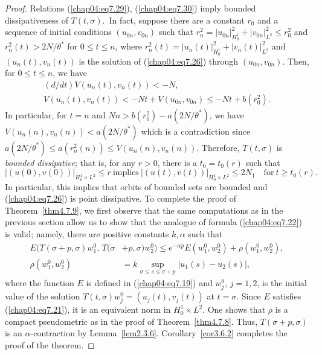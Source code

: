 \documentclass{surv-l}
\theoremstyle{plain}
\theoremstyle{definition}
\numberwithin{equation}{section}
\numberwithin{figure}{chapter}
\begin{document}
\begin{proof}
Relations (\ref{chap04:eq7.29}), (\ref{chap04:eq7.30}) imply bounded dissipativeness of $T(t, \sigma)$.\, In fact, suppose there are a constant $r_{0}$ and a sequence of initial conditions $(u_{0n}, v_{0n})$ such that $r_{n}^{2}=|u_{0n}|_{H_{0}^{1}}^{2}+|v_{0n}|_{L^{2}}^{2}\leq r_{0}^{2}$ and $r_{n}^{2}(t)>2N/\theta^{\ast}$ for $0\leq t\leq n$, where $r_{n}^{2}(t)=|u_{n}(t)|_{H_{0}^{1}}^{2}+|v_{n}(t)|_{L^{2}}^{2}$ and $(u_{n}(t), v_{n}(t))$ is the solution of (\ref{chap04:eq7.26}) through $(u_{0n}, v_{0n})$. Then, for $0\leq t\leq n$, we have
\begin{gather*}
(d/dt)V(u_{n}(t), v_{n}(t))<-N,\\
V(u_{n}(t), v_{n}(t))<-Nt+V(u_{0n}, v_{0n})\leq-Nt+b(r_{0}^{2}).
\end{gather*}
In particular, for $t=n$ and $Nn>b(r_{0}^{2})-a(2N/\theta^{\ast})$, we have $V(u_{n}(n), v_{n}(n))< a(2N/\theta^{\ast})$ which is a contradiction since $a(2N/\theta^{\ast})\leq a(r_{n}^{2}(n))\leq V(u_{n}(n), v_{n}(n))$.
Therefore, $T(t, \sigma)$ is \emph{bounded dissipative}; that is, for any $r>0$, there is a $t_{0}= t_{0}(r)$ such that
\begin{equation*}
|(u(0), v(0))|_{H_{0}^{1}\times L^{2}}\leq r\ \mathrm{implies}\ |(u(t), v(t))|_{H_{0}^{1}\times L^{2}}\leq 2N_{1}\quad \mathrm{for}\ t\geq t_{0}(r).
\end{equation*}
In particular, this implies that orbits of bounded sets are bounded and (\ref{chap04:eq7.26}) is point dissipative. To complete the proof of Theorem~\ref{thm4.7.9}, we first observe that the same computations as in the previous section allow us to show that the analogue of formula (\ref{chap04:eq7.22}) is valid; namely, there are positive constants $k, \alpha$ such that
\begin{align*}
E(T(\sigma+p, \sigma)w_{1}^{0},\, T(\sigma&+p, \sigma)w_{2}^{0})\leq e^{-\alpha p}E(w_{1}^{0}, w_{2}^{0})+\rho(w_{1}^{0}, w_{2}^{0}),\\
\rho(w_{1}^{0}, w_{2}^{0})&=k\sup_{\sigma\leq s\leq\sigma+p}|u_{1}(s)-u_{2}(s)|,
\end{align*}
where the function $E$ is defined in (\ref{chap04:eq7.19}) and $w_{j}^{0},\, j=1,2$, is the initial value of the solution $T(t, \sigma)w_{j}^{0}=(u_{j}(t), v_{j}(t))$ at $ t=\sigma$. Since $E$ satisfies (\ref{chap04:eq7.21}), it is an equivalent norm in $H_{0}^{1}\times L^{2}$. One shows that $\rho$ is a compact pseudometric as in the proof of Theorem~\ref{thm4.7.8}. Thus, $T(\sigma+p, \sigma)$ is an $\alpha$-contraction by Lemma~\ref{lem2.3.6}. Corollary~\ref{cor3.6.2} completes the proof of the theorem.
\end{proof}
\end{document}
